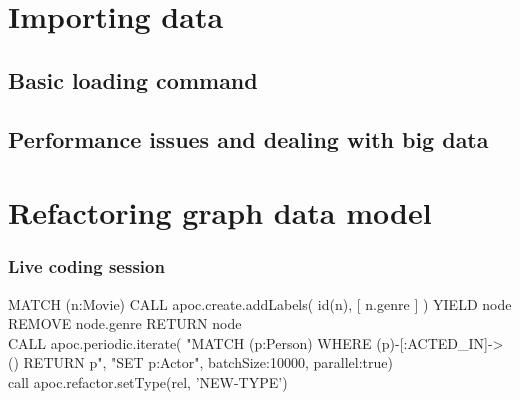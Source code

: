 \documentclass[12pt]{beamer}
\begin{document}
    \section{Importing data}
    \subsection{Basic loading command}
    \subsection{Performance issues and dealing with big data}
    
    
    \section{Refactoring graph data model}
    \begin{frame}
        \frametitle{Live coding session}
        MATCH (n:Movie)
        CALL apoc.create.addLabels( id(n), [ n.genre ] ) YIELD node
        REMOVE node.genre
        RETURN node
        \\
        CALL apoc.periodic.iterate(
        "MATCH (p:Person) WHERE (p)-[:ACTED\_IN]->() RETURN p",
        "SET p:Actor", {batchSize:10000, parallel:true})
        \\
        call apoc.refactor.setType(rel, 'NEW-TYPE')
    \end{frame}
    
\end{document}
